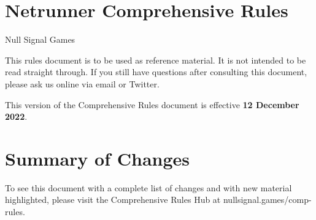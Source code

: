 \documentclass{article}
\newcommand{\subtitle}[1]{{\Large #1 \vspace{2ex}}}
\begin{document}

\section*{Netrunner Comprehensive Rules}
\subtitle{\color{darkgray}Null Signal Games}

\noindent
This rules document is to be used as reference material. It is not intended to be read straight through. If you still have questions after consulting this document, please ask us online via email or Twitter.

\noindent
This version of the Comprehensive Rules document is effective \textbf{12 December 2022}.

\section*{Summary of Changes}

\noindent
To see this document with a complete list of changes and with new material highlighted, please visit the Comprehensive Rules Hub at \textlangle{}nullsignal.games/comp-rules\textrangle.

\begin{outline}[enumerate]
\end{outline}


\newpage

\makeatletter
\renewcommand{\l@section}{\@dottedtocline{1}{1.8em}{1.4em}}
\renewcommand{\l@subsection}{\@dottedtocline{2}{3.4em}{2.5em}}
\renewcommand{\l@subsubsection}{\@dottedtocline{3}{6em}{2.5em}}
\makeatother


\begin{multicols}{2}
  \tableofcontents
\end{multicols}


\newpage




\newpage
\end{document}
